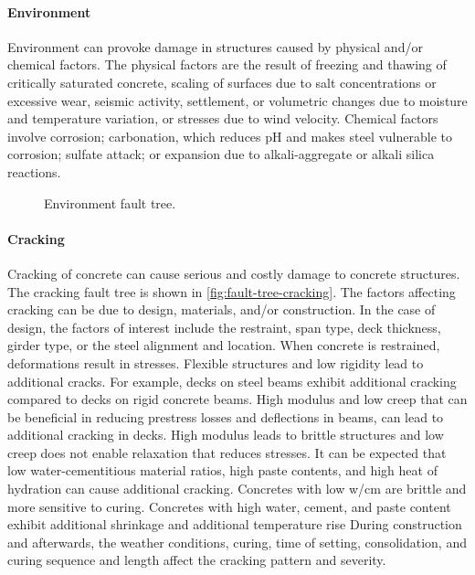 \paragraph{Environment}
Environment can provoke damage in structures caused by physical and/or chemical factors. The physical factors
are the result of freezing and thawing of critically saturated concrete, scaling of surfaces due to salt concentrations or
excessive wear, seismic activity, settlement, or volumetric changes due to moisture and temperature variation, or
stresses due to wind velocity. Chemical factors involve corrosion; carbonation, which reduces pH and makes steel
vulnerable to corrosion; sulfate attack; or expansion due to alkali-aggregate or alkali silica reactions.

\begin{figure}
  \caption{Environment fault tree.}
  \label{fig:fault-tree-environment} 
\end{figure}

\paragraph{Cracking}
Cracking of concrete can cause serious and costly damage to concrete structures. The cracking fault tree is shown in \cref{fig:fault-tree-cracking}. The factors affecting cracking can be due to design, materials, and/or construction. In the case of design, the factors of interest include the restraint, span type, deck thickness, girder type, or the steel alignment and location. When concrete is restrained, deformations result in stresses. Flexible structures and low rigidity lead to additional cracks. For example, decks on steel beams exhibit additional cracking compared to decks on rigid concrete beams. High modulus and low creep that can be beneficial in reducing prestress losses and deflections in beams, can lead to additional cracking in decks. High modulus leads to brittle structures and low creep does not enable relaxation that reduces stresses. It can be expected that low water-cementitious material ratios, high paste contents, and high heat of hydration can cause additional cracking. Concretes with low w/cm are brittle and more sensitive to curing. Concretes with high water, cement, and paste content exhibit additional shrinkage and additional temperature rise During construction and afterwards, the weather conditions, curing, time of setting, consolidation, and curing sequence and length affect the cracking pattern and severity.

